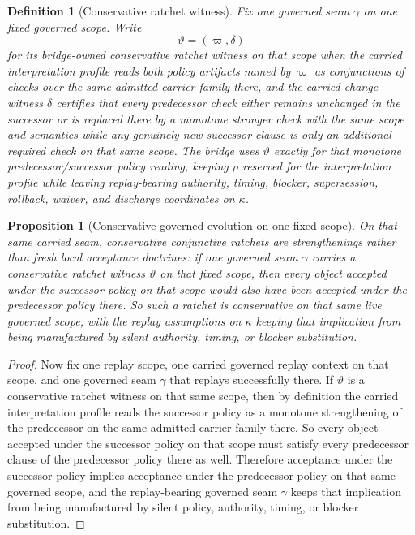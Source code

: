 \documentclass[11pt]{article}
\newtheorem{definition}{Definition}
\newtheorem{proposition}{Proposition}
\begin{document}
\begin{definition}[Conservative ratchet witness]
Fix one governed seam $\gamma$ on one fixed governed scope.
Write
\[
\vartheta=(\varpi,\delta)
\]
for its bridge-owned \emph{conservative ratchet witness} on that scope when the carried interpretation profile reads both policy artifacts named by $\varpi$ as conjunctions of checks over the same admitted carrier family there, and the carried change witness $\delta$ certifies that every predecessor check either remains unchanged in the successor or is replaced there by a monotone stronger check with the same scope and semantics while any genuinely new successor clause is only an additional required check on that same scope.
The bridge uses $\vartheta$ exactly for that monotone predecessor/successor policy reading, keeping $\rho$ reserved for the interpretation profile while leaving replay-bearing authority, timing, blocker, supersession, rollback, waiver, and discharge coordinates on $\kappa$.
\end{definition}

\begin{proposition}[Conservative governed evolution on one fixed scope]
On that same carried seam, conservative conjunctive ratchets are strengthenings rather than fresh local acceptance doctrines: if one governed seam $\gamma$ carries a conservative ratchet witness $\vartheta$ on that fixed scope,
then every object accepted under the successor policy on that scope would also have been accepted under the predecessor policy there.
So such a ratchet is conservative on that same live governed scope, with the replay assumptions on $\kappa$ keeping that implication from being manufactured by silent authority, timing, or blocker substitution.
\end{proposition}

\begin{proof}
Now fix one replay scope, one carried governed replay context on that scope, and one governed seam $\gamma$ that replays successfully there.
If $\vartheta$ is a conservative ratchet witness on that same scope, then by definition the carried interpretation profile reads the successor policy as a monotone strengthening of the predecessor on the same admitted carrier family there.
So every object accepted under the successor policy on that scope must satisfy every predecessor clause of the predecessor policy there as well.
Therefore acceptance under the successor policy implies acceptance under the predecessor policy on that same governed scope, and the replay-bearing governed seam $\gamma$ keeps that implication from being manufactured by silent policy, authority, timing, or blocker substitution.
\end{proof}
\end{document}
